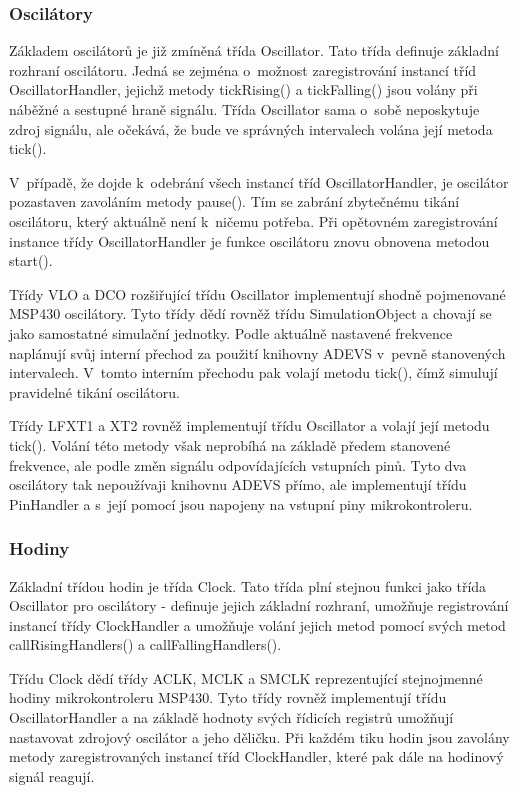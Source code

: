 \subsubsection{Oscilátory}

Základem oscilátorů je již zmíněná třída Oscillator. Tato třída definuje základní rozhraní oscilátoru. Jedná se zejména o~možnost zaregistrování instancí tříd OscillatorHandler, jejichž metody tickRising() a tickFalling() jsou volány při náběžné a sestupné hraně signálu. Třída Oscillator sama o~sobě neposkytuje zdroj signálu, ale očekává, že bude ve správných intervalech volána její metoda tick().

V~případě, že dojde k~odebrání všech instancí tříd OscillatorHandler, je oscilátor pozastaven zavoláním metody pause(). Tím se zabrání zbytečnému tikání oscilátoru, který aktuálně není k~ničemu potřeba. Při opětovném zaregistrování instance třídy OscillatorHandler je funkce oscilátoru znovu obnovena metodou start().

Třídy VLO a DCO rozšiřující třídu Oscillator implementují shodně pojmenované MSP430 oscilátory. Tyto třídy dědí rovněž třídu SimulationObject a chovají se jako samostatné simulační jednotky. Podle aktuálně nastavené frekvence naplánují svůj interní přechod za použití knihovny ADEVS v~pevně stanovených intervalech. V~tomto interním přechodu pak volají metodu tick(), čímž simulují pravidelné tikání oscilátoru.

Třídy LFXT1 a XT2 rovněž implementují třídu Oscillator a volají její metodu tick(). Volání této metody však neprobíhá na základě předem stanovené frekvence, ale podle změn signálu odpovídajících vstupních pinů. Tyto dva oscilátory tak nepoužívaji knihovnu ADEVS přímo, ale implementují třídu PinHandler a s~její pomocí jsou napojeny na vstupní piny mikrokontroleru.

\subsubsection{Hodiny}

Základní třídou hodin je třída Clock. Tato třída plní stejnou funkci jako třída Oscillator pro oscilátory - definuje jejich základní rozhraní, umožňuje registrování instancí třídy ClockHandler a umožňuje volání jejich metod pomocí svých metod callRisingHandlers() a callFallingHandlers().

Třídu Clock dědí třídy ACLK, MCLK a SMCLK reprezentující stejnojmenné hodiny mikrokontroleru MSP430. Tyto třídy rovněž implementují třídu OscillatorHandler a na základě hodnoty svých řídicích registrů umožňují nastavovat zdrojový oscilátor a jeho děličku. Při každém tiku hodin jsou zavolány metody zaregistrovaných instancí tříd ClockHandler, které pak dále na hodinový signál reagují.

